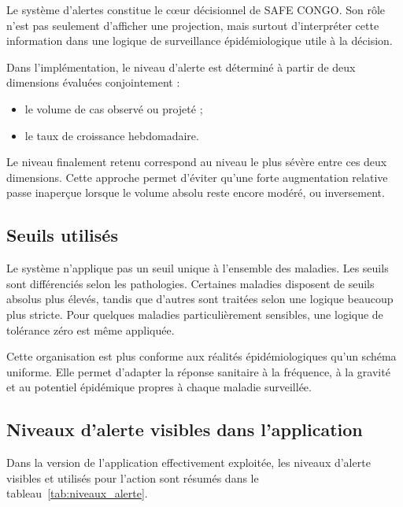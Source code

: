Le système d'alertes constitue le c\oe{}ur décisionnel de SAFE CONGO. Son rôle n'est pas seulement d'afficher une projection, mais surtout d'interpréter cette information dans une logique de surveillance épidémiologique utile à la décision.

Dans l'implémentation, le niveau d'alerte est déterminé à partir de deux dimensions évaluées conjointement :

\begin{itemize}
  \item le volume de cas observé ou projeté ;
  \item le taux de croissance hebdomadaire.
\end{itemize}

Le niveau finalement retenu correspond au niveau le plus sévère entre ces deux dimensions. Cette approche permet d'éviter qu'une forte augmentation relative passe inaperçue lorsque le volume absolu reste encore modéré, ou inversement.

\subsection{Seuils utilisés}

Le système n'applique pas un seuil unique à l'ensemble des maladies. Les seuils sont différenciés selon les pathologies. Certaines maladies disposent de seuils absolus plus élevés, tandis que d'autres sont traitées selon une logique beaucoup plus stricte. Pour quelques maladies particulièrement sensibles, une logique de tolérance zéro est même appliquée.

Cette organisation est plus conforme aux réalités épidémiologiques qu'un schéma uniforme. Elle permet d'adapter la réponse sanitaire à la fréquence, à la gravité et au potentiel épidémique propres à chaque maladie surveillée.

\subsection{Niveaux d'alerte visibles dans l'application}

Dans la version de l'application effectivement exploitée, les niveaux d'alerte visibles et utilisés pour l'action sont résumés dans le tableau~\ref{tab:niveaux_alerte}.

